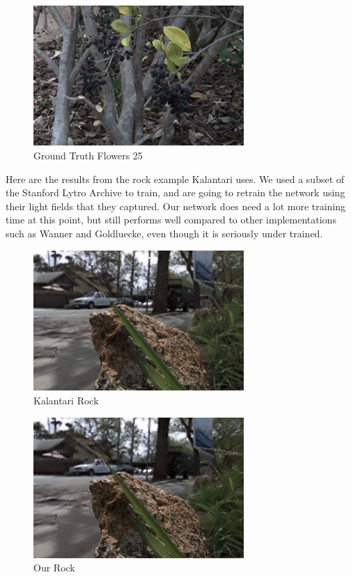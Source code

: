 \documentclass[10pt,twocolumn,letterpaper]{article}
\begin{document}
\begin{figure}[h]
\begin{center}
\caption{Ground Truth Flowers 25}
\includegraphics[width=8cm]{flowers_25/truth_05_05.png}
\end{center}
\end{figure}


Here are the results from the rock example Kalantari uses. We used a subset of the Stanford Lytro Archive to train, and are
going to retrain the network using their light fields that they captured. Our network does need a lot more training time
at this point, but still performs well compared to other implementations such as Wanner and Goldluecke, even though
it is seriously under trained. 

\begin{figure}[h]
\begin{center}
\caption{Kalantari \etal Rock}
\includegraphics[width=8cm]{rock/kalantari_05_05.png}
\end{center}
\end{figure}

\begin{figure}[h]
\begin{center}
\caption{Our Rock}
\includegraphics[width=8cm]{rock/ours_05_05.png}
\end{center}
\end{figure}
\end{document}
